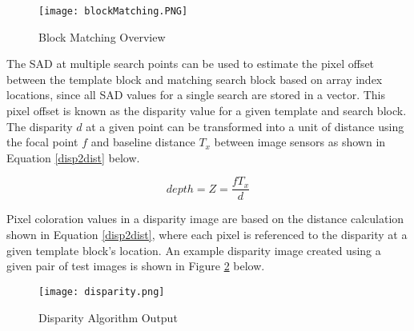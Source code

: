 \par
\begin{figure}[h]
	\centerline{\texttt{[image: blockMatching.PNG]}}
	\caption{Block Matching Overview \cite{collins}}
	\label{blockMatching}
\end{figure}
\par
The SAD at multiple search points can be used to estimate the pixel offset between the template block and matching search block based on array index locations, since all SAD values for a single search are stored in a vector. This pixel offset is known as the disparity value for a given template and search block. The disparity $d$ at a given point can be transformed into a unit of distance using the focal point $f$ and baseline distance $T_x$ between image sensors as shown in Equation \ref{disp2dist} below. 
\par
\begin{equation}\label{disp2dist}
depth = Z = \frac{fT_x}{d}
\end{equation}
\par
Pixel coloration values in a disparity image are based on the distance calculation shown in Equation \ref{disp2dist}, where each pixel is referenced to the disparity at a given template block's location. An example disparity image created using a given pair of test images is shown in Figure \ref{disparityOutput} below. 
\par
\begin{figure}[H]
	\centerline{\texttt{[image: disparity.png]}}
	\caption{Disparity Algorithm Output}
	\label{disparityOutput}
\end{figure}